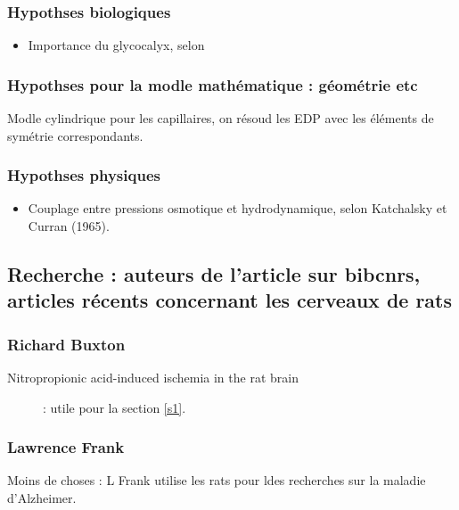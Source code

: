 \subsubsection{Hypothses biologiques}

\begin{itemize}
\item Importance du glycocalyx, selon \cite{levst}
\end{itemize}

\subsubsection{Hypothses pour la modle math\'ematique : g\'eom\'etrie etc}

Modle cylindrique pour les capillaires, on r\'esoud les EDP avec les \'el\'ements de sym\'etrie correspondants.

\subsubsection{Hypothses physiques}

\begin{itemize}
\item Couplage entre pressions osmotique et hydrodynamique, selon Katchalsky et Curran (1965).

\end{itemize}

\subsection{Recherche : auteurs de l'article \cite{bufr97} sur bibcnrs, articles r\'ecents concernant les cerveaux de rats}

\subsubsection{Richard Buxton}

\begin{description}
\item[Nitropropionic acid-induced ischemia in the rat brain \cite{nibr}] : utile pour la section \ref{s1}.
\end{description}

\subsubsection{Lawrence Frank}

Moins de choses : L Frank utilise les rats pour ldes recherches sur la maladie d'Alzheimer.